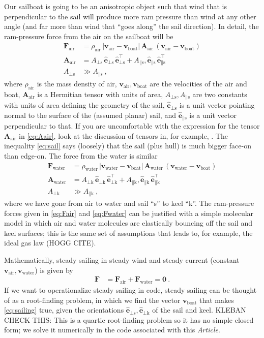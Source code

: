 \documentclass{article}
\renewcommand{\vec}[1]{\boldsymbol{#1}}
\newcommand{\uvec}{\vec{\hat{e}}}
\newcommand{\tensor}[1]{\mathbf{#1}}
\newcommand{\air}{\text{air}}
\newcommand{\water}{\text{water}}
\newcommand{\boat}{\text{boat}}
\newcommand{\sail}{\text{s}}
\newcommand{\keel}{\text{k}}
\newcommand{\vair}{\vec{v}_\air}
\newcommand{\vwater}{\vec{v}_\water}
\newcommand{\vboat}{\vec{v}_\boat}
\newcommand{\documentname}{\textsl{Article}}
\begin{document}
Our sailboat is going to be an anisotropic object such that wind that is perpendicular to the sail will produce more ram pressure than wind at any other angle (and far more than wind that ``goes along'' the sail direction).
In detail, the ram-pressure force from the air on the sailboat will be
\begin{align}
    \vec{F}_\air &= \rho_\air\,|\vair - \vboat|\,\tensor{A}_\air\,(\vair - \vboat) \label{eq:Fair}
    \\
    \tensor{A}_\air &= A_{\perp\sail}\,\uvec_{\perp\sail}\,\uvec_{\perp\sail}^\top + A_{\parallel\sail},\uvec_{\parallel\sail}\,\uvec_{\parallel\sail}^\top \label{eq:Aair}
    \\
    A_{\perp\sail} &\gg A_{\parallel\sail} \label{eq:sail}
    ~,
\end{align}
where $\rho_\air$ is the mass density of air, $\vair,\vboat$ are the velocities of the air and boat, $\tensor{A}_\air$ is a Hermitian tensor with units of area, $A_{\perp\sail}, A_{\parallel\sail}$ are two constants with units of area defining the geometry of the sail, $\uvec_{\perp\sail}$ is a unit vector pointing normal to the surface of the (assumed planar) sail, and $\uvec_{\parallel\sail}$ is a unit vector perpendicular to that.
If you are uncomfortable with the expression for the tensor $\tensor{A}_\air$ in \eqref{eq:Aair}, look at the discussion of tensors in, for example, \cite{kusse}.
The inequality \eqref{eq:sail} says (loosely) that the sail (plus hull) is much bigger face-on than edge-on.
The force from the water is similar
\begin{align}
    \vec{F}_\water &= \rho_\water\,|\vwater - \vboat|\,\tensor{A}_\water\,(\vwater - \vboat) \label{eq:Fwater}
    \\
    \tensor{A}_\water &= A_{\perp\keel}\,\uvec_{\perp\keel}\,\uvec_{\perp\keel}^\top + A_{\parallel\keel},\uvec_{\parallel\keel}\,\uvec_{\parallel\keel}^\top
    \\
    A_{\perp\keel} &\gg A_{\parallel\keel} ~,
\end{align}
where we have gone from air to water and sail ``s'' to keel ``k''.
The ram-pressure forces given in \eqref{eq:Fair} and \eqref{eq:Fwater} can be justified with a simple molecular model in which air and water molecules are elastically bouncing off the sail and keel surfaces; this is the same set of assumptions that leads to, for example, the ideal gas law (HOGG CITE).

Mathematically, steady sailing in steady wind and steady current (constant $\vair, \vwater$) is given by
\begin{align}\label{eq:sailing}
    \vec{F} &= \vec{F}_\air + \vec{F}_\water = \vec{0} ~.
\end{align}
If we want to operationalize steady sailing in code, steady sailing can be thought of as a root-finding problem, in which we find the vector $\vboat$ that makes \eqref{eq:sailing} true, given the orientations $\uvec_{\perp\sail}, \uvec_{\perp\keel}$ of the sail and keel. KLEBAN CHECK THIS: This is a quartic root-finding problem so it has no simple closed form; we solve it numerically in the code associated with this \documentname.
\end{document}
